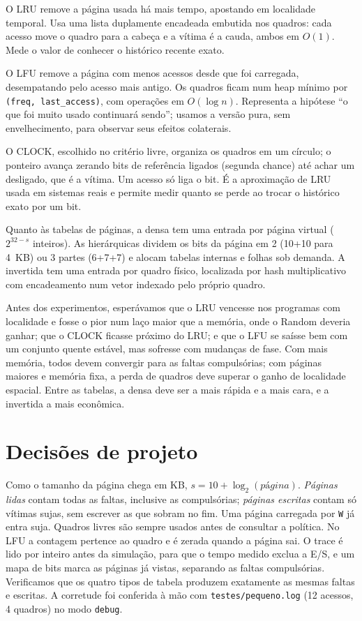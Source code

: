 \documentclass[11pt,a4paper]{article}
\begin{document}
O LRU remove a página usada há mais tempo, apostando em
localidade temporal. Usa uma lista duplamente encadeada embutida nos
quadros: cada acesso move o quadro para a cabeça e a vítima é a cauda,
ambos em $O(1)$. Mede o valor de conhecer o histórico recente exato.

O LFU remove a página com menos acessos desde que foi
carregada, desempatando pelo acesso mais antigo. Os quadros ficam num
heap mínimo por \texttt{(freq, last\_access)}, com operações em
$O(\log n)$. Representa a hipótese ``o que foi muito usado continuará
sendo''; usamos a versão pura, sem envelhecimento, para observar seus
efeitos colaterais.

O CLOCK, escolhido no critério livre, organiza os quadros em um
círculo; o
ponteiro avança zerando bits de referência ligados (segunda chance) até
achar um desligado, que é a vítima. Um acesso só liga o bit. É a
aproximação de LRU usada em sistemas reais e permite medir quanto se
perde ao trocar o histórico exato por um bit.

Quanto às tabelas de páginas, a densa tem uma entrada por
página virtual ($2^{32-s}$ inteiros). As hierárquicas dividem os
bits da página em 2 (10+10 para 4~KB) ou 3 partes (6+7+7) e alocam
tabelas internas e folhas sob demanda. A invertida tem uma
entrada por quadro físico, localizada por hash multiplicativo com
encadeamento num vetor indexado pelo próprio quadro.

Antes dos experimentos, esperávamos que o LRU vencesse nos programas com
localidade e fosse o pior num laço maior que a memória, onde o Random
deveria ganhar; que o CLOCK ficasse próximo do LRU; e que o LFU se
saísse bem com um conjunto quente estável, mas sofresse com mudanças de
fase. Com mais memória, todos devem convergir para as faltas
compulsórias; com páginas maiores e memória fixa, a perda de quadros
deve superar o ganho de localidade espacial. Entre as tabelas, a densa
deve ser a mais rápida e a mais cara, e a invertida a mais econômica.

\section{Decisões de projeto}

Como o tamanho da página chega em KB, $s = 10 + \log_2(\textit{página})$.
\emph{Páginas lidas} contam todas as faltas, inclusive as compulsórias;
\emph{páginas escritas} contam só vítimas sujas, sem escrever as que
sobram no fim. Uma página carregada por \texttt{W} já entra suja.
Quadros livres são sempre usados antes de consultar a política. No LFU
a contagem pertence ao quadro e é zerada quando a página sai. O trace é
lido por inteiro antes da simulação, para que o tempo medido exclua a
E/S, e um mapa de bits marca as páginas já vistas, separando as faltas
compulsórias. Verificamos que os quatro tipos de tabela produzem
exatamente as mesmas faltas e escritas. A corretude foi conferida à mão
com \texttt{testes/pequeno.log} (12 acessos, 4 quadros) no modo
\texttt{debug}.
\end{document}
